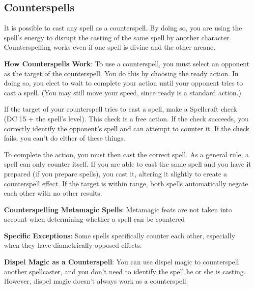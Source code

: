 \subsection{Counterspells}
It is possible to cast any spell as a counterspell. By doing so, you are using the spell's energy to disrupt the casting of the same spell by another character. Counterspelling works even if one spell is divine and the other arcane.

\textbf{How Counterspells Work}: To use a counterspell, you must select an opponent as the target of the counterspell. You do this by choosing the ready action. In doing so, you elect to wait to complete your action until your opponent tries to cast a spell. (You may still move your speed, since ready is a standard action.)

If the target of your counterspell tries to cast a spell, make a Spellcraft check (DC 15 + the spell's level). This check is a free action. If the check succeeds, you correctly identify the opponent's spell and can attempt to counter it. If the check fails, you can't do either of these things.

To complete the action, you must then cast the correct spell. As a general rule, a spell can only counter itself. If you are able to cast the same spell and you have it prepared (if you prepare spells), you cast it, altering it slightly to create a counterspell effect. If the target is within range, both spells automatically negate each other with no other results.

\textbf{Counterspelling Metamagic Spells}: Metamagic feats are not taken into account when determining whether a spell can be countered

\textbf{Specific Exceptions}: Some spells specifically counter each other, especially when they have diametrically opposed effects.

\textbf{Dispel Magic as a Counterspell}: You can use dispel magic to counterspell another spellcaster, and you don't need to identify the spell he or she is casting. However, dispel magic doesn't always work as a counterspell.